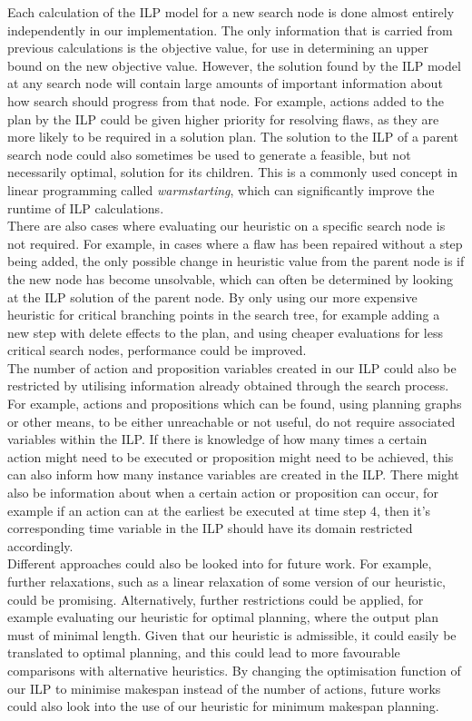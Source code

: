 Each calculation of the ILP model for a new search node is done almost entirely independently in our implementation. The only information that is carried from previous calculations is the objective value, for use in determining an upper bound on the new objective value. However, the solution found by the ILP model at any search node will contain large amounts of important information about how search should progress from that node. For example, actions added to the plan by the ILP could be given higher priority for resolving flaws, as they are more likely to be required in a solution plan. The solution to the ILP of a parent search node could also sometimes be used to generate a feasible, but not necessarily optimal, solution for its children. This is a commonly used concept in linear programming called \textit{warmstarting}, which can significantly improve the runtime of ILP calculations.\\


There are also cases where evaluating our heuristic on a specific search node is not required. For example, in cases where a flaw has been repaired without a step being added, the only possible change in heuristic value from the parent node is if the new node has become unsolvable, which can often be determined by looking at the ILP solution of the parent node. By only using our more expensive heuristic for critical branching points in the search tree, for example adding a new step with delete effects to the plan, and using cheaper evaluations for less critical search nodes, performance could be improved.\\


The number of action and proposition variables created in our ILP could also be restricted by utilising information already obtained through the search process. For example, actions and propositions which can be found, using planning graphs or other means, to be either unreachable or not useful, do not require associated variables within the ILP. If there is knowledge of how many times a certain action might need to be executed or proposition might need to be achieved, this can also inform how many instance variables are created in the ILP. There might also be information about when a certain action or proposition can occur, for example if an action can at the earliest be executed at time step 4, then it's corresponding time variable in the ILP should have its domain restricted accordingly.\\


Different approaches could also be looked into for future work. For example, further relaxations, such as a linear relaxation of some version of our heuristic, could be promising. Alternatively, further restrictions could be applied, for example evaluating our heuristic for optimal planning, where the output plan must of minimal length. Given that our heuristic is admissible, it could easily be translated to optimal planning, and this could lead to more favourable comparisons with alternative heuristics. By changing the optimisation function of our ILP to minimise makespan instead of the number of actions, future works could also look into the use of our heuristic for minimum makespan planning.